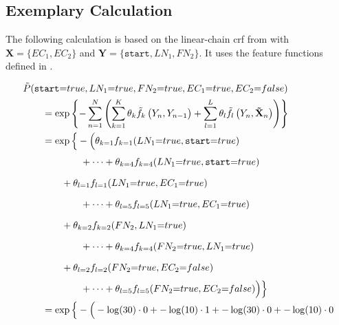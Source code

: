 \subsection{Exemplary Calculation}\label{app:subsec-lccrf-example-calculation}
The following calculation is based on the \gls{linear-chain crf} from  with $\mathbf{X}=\{EC_1,EC_2\}$ and $\mathbf{Y}=\{\texttt{start},LN_1,FN_2\}$.
It uses the \glspl{feature function} defined in .

\begin{subequations}
\begin{equation*}
\begin{split}
  &\tilde{P}(\texttt{start}{=}true,LN_1{=}true,FN_2{=}true,EC_1{=}true,EC_2{=}false)\\
  &\hspace{2em} = \exp\left\{ -\sum_{n=1}^N \left(\sum_{k=1}^K\theta_k \tilde{f}_k\left(\vphantom{\tilde{X}}Y_n,Y_{n-1}\right)+\sum_{l=1}^L\theta_l \tilde{f}_l\left(Y_n,\mathbf{\tilde{X}}_n\right)\right) \right\} \\
  &\hspace{2em} = \exp\Big\{-\Big(\theta_{k=1}f_{k=1}(LN_1{=}true,\texttt{start}{=}true)\\
  &\hspace{6em}\vphantom{\Big\{}+\cdots+\theta_{k=4}f_{k=4}(LN_1{=}true,\texttt{start}{=}true)\\
  &\hspace{4em}\vphantom{\Big\{}+\theta_{l=1}f_{l=1}(LN_1{=}true,EC_1{=}true)\\
  &\hspace{6em}\vphantom{\Big\{}+\cdots+\theta_{l=5}f_{l=5}(LN_1{=}true,EC_1{=}true)\\
  &\hspace{4em}\vphantom{\Big\{}+\theta_{k=2}f_{k=2}(FN_2,LN_1{=}true)\\
  &\hspace{6em}\vphantom{\Big\{}+\cdots+\theta_{k=4}f_{k=4}(FN_2{=}true,LN_1{=}true) \\
  &\hspace{4em}\vphantom{\Big\{}+\theta_{l=2}f_{l=2}(FN_2{=}true,EC_2{=}false)\\
  &\hspace{6em}\vphantom{\Big\{}+\cdots+\theta_{l=5}f_{l=5}(FN_2{=}true,EC_2{=}false)\Big)\Big\}\\
  &\hspace{2em} = \exp\Big\{-\Big(-\log(30)\cdot0+-\log(10)\cdot1+-\log(30)\cdot0+-\log(10)\cdot0\\

\end{split}
\end{equation*}
\end{subequations}
